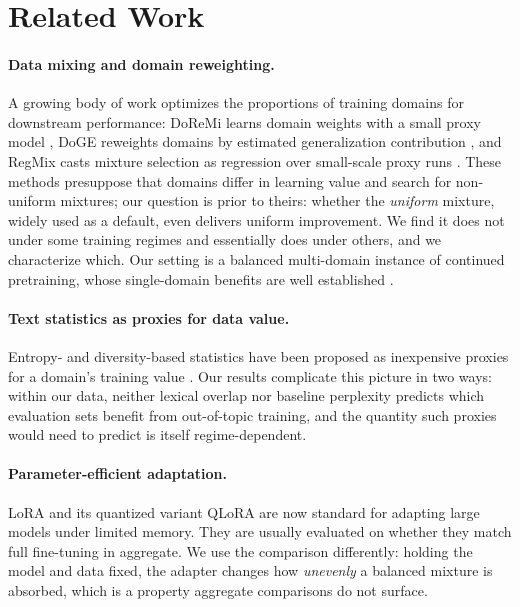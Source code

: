 \documentclass[11pt]{article}
\begin{document}
\section{Related Work}
\label{sec:related}

\paragraph{Data mixing and domain reweighting.}
A growing body of work optimizes the proportions of training domains for
downstream performance: DoReMi learns domain weights with a small proxy
model \citep{doremi}, DoGE reweights domains by estimated generalization
contribution \citep{doge}, and RegMix casts mixture selection as regression
over small-scale proxy runs \citep{regmix}. These methods presuppose that
domains differ in learning value and search for non-uniform mixtures; our
question is prior to theirs: whether the \emph{uniform} mixture, widely used
as a default, even delivers uniform improvement. We find it does not under
some training regimes and essentially does under others, and we characterize
which. Our setting is a balanced multi-domain instance of continued
pretraining, whose single-domain benefits are well established
\citep{gururangan2020dont}.

\paragraph{Text statistics as proxies for data value.}
Entropy- and diversity-based statistics have been proposed as inexpensive
proxies for a domain's training value \citep{bimix}. Our results complicate
this picture in two ways: within our data, neither lexical overlap nor
baseline perplexity predicts which evaluation sets benefit from out-of-topic
training, and the quantity such proxies would need to predict is itself
regime-dependent.

\paragraph{Parameter-efficient adaptation.}
LoRA \citep{lora} and its quantized variant QLoRA \citep{qlora} are now
standard for adapting large models under limited memory. They are usually
evaluated on whether they match full fine-tuning in aggregate. We use the
comparison differently: holding the model and data fixed, the adapter
changes how \emph{unevenly} a balanced mixture is absorbed, which is a
property aggregate comparisons do not surface.
\end{document}
